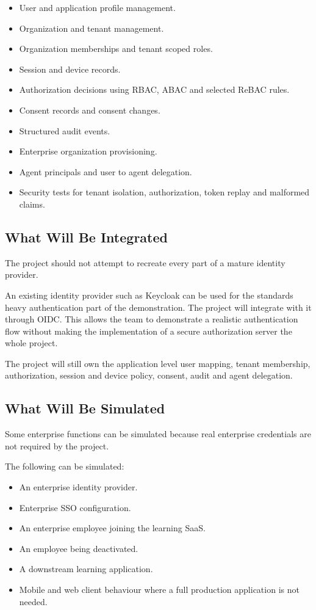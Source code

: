 \documentclass[11pt,a4paper]{article}
\begin{document}
\begin{itemize}
    \item User and application profile management.
    \item Organization and tenant management.
    \item Organization memberships and tenant scoped roles.
    \item Session and device records.
    \item Authorization decisions using RBAC, ABAC and selected ReBAC rules.
    \item Consent records and consent changes.
    \item Structured audit events.
    \item Enterprise organization provisioning.
    \item Agent principals and user to agent delegation.
    \item Security tests for tenant isolation, authorization, token replay and malformed claims.
\end{itemize}

\subsection{What Will Be Integrated}

The project should not attempt to recreate every part of a mature identity provider.

An existing identity provider such as Keycloak can be used for the standards heavy authentication part of the demonstration. The project will integrate with it through OIDC. This allows the team to demonstrate a realistic authentication flow without making the implementation of a secure authorization server the whole project.

The project will still own the application level user mapping, tenant membership, authorization, session and device policy, consent, audit and agent delegation.

\subsection{What Will Be Simulated}

Some enterprise functions can be simulated because real enterprise credentials are not required by the project.

The following can be simulated:

\begin{itemize}
    \item An enterprise identity provider.
    \item Enterprise SSO configuration.
    \item An enterprise employee joining the learning SaaS.
    \item An employee being deactivated.
    \item A downstream learning application.
    \item Mobile and web client behaviour where a full production application is not needed.
\end{itemize}
\end{document}
